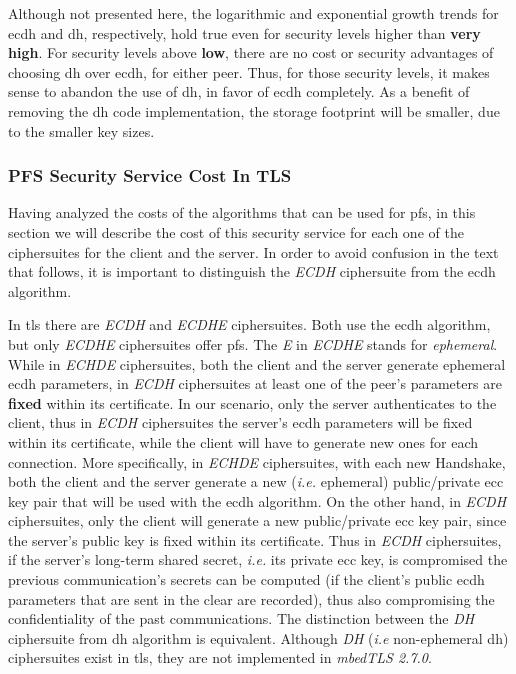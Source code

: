 Although not presented here, the logarithmic and exponential growth trends for \gls{ecdh} and \gls{dh}, respectively, hold true even for
security levels higher than \textbf{very high}. For security levels above \textbf{low}, there are no cost or security
advantages of choosing \gls{dh} over \gls{ecdh}, for either peer. Thus, for those security levels, it makes sense to abandon the
use of \gls{dh}, in favor of \gls{ecdh} completely. As a benefit of removing the \gls{dh} code implementation, the storage footprint will be smaller, due
to the smaller key sizes.


\subsubsection{PFS Security Service Cost In TLS} \label{sec:pfs-cost-in-tls}

Having analyzed the costs of the algorithms that can be used for \gls{pfs}, in this section we will describe the cost of this security service
for each one of the ciphersuites for the client and the server. In order to avoid confusion in the text that follows, it is important to
distinguish the \textit{ECDH} ciphersuite from the \gls{ecdh} algorithm.

In \gls{tls} there are \textit{ECDH} and \textit{ECDHE} ciphersuites. Both use the \gls{ecdh} algorithm, but only \textit{ECDHE} ciphersuites
offer \gls{pfs}. The \textit{E} in \textit{ECDHE} stands for \textit{ephemeral}. While in \textit{ECHDE} ciphersuites, both the client and the server
generate ephemeral \gls{ecdh} parameters, in \textit{ECDH} ciphersuites at least one of the peer's parameters are \textbf{fixed}
within its certificate. In our scenario, only the server authenticates to the client, thus in \textit{ECDH} ciphersuites the server's
\gls{ecdh} parameters will be fixed within its certificate, while the client will have to generate new ones for each connection.
More specifically, in \textit{ECHDE} ciphersuites, with each  new Handshake, both the client and the server generate a new (\textit{i.e.} ephemeral)
public/private \gls{ecc} key pair that will be used with the \gls{ecdh} algorithm. On the other hand, in \textit{ECDH} ciphersuites, only the client
will generate a new public/private \gls{ecc} key pair, since the server's public key is fixed within its certificate. Thus in \textit{ECDH}
ciphersuites, if the server's long-term shared secret, \textit{i.e.} its private \gls{ecc} key, is compromised the previous communication's secrets
can be computed (if the client's public \gls{ecdh} parameters that are sent in the clear are recorded), thus also compromising the confidentiality of
the past communications. The distinction between the \textit{DH} ciphersuite from \gls{dh} algorithm is equivalent. Although \textit{DH} (\textit{i.e}
non-ephemeral \gls{dh}) ciphersuites exist in \gls{tls}, they are not implemented in \textit{mbedTLS 2.7.0}.

